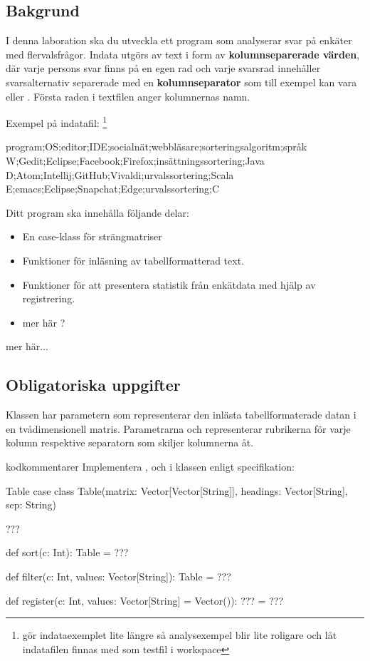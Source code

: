 \subsection{Bakgrund}

I denna laboration ska du utveckla ett program som analyserar svar på enkäter med flervalsfrågor. Indata utgörs av text i form av \textbf{kolumnseparerade värden}, där varje persons svar finns på en egen rad och varje svarsrad innehåller svarsalternativ separerade med en \textbf{kolumnseparator} som till exempel kan vara \code{;} eller \code{\t}. Första raden i textfilen anger kolumnernas namn.

Exempel på indatafil: \footnote{\TODO gör indataexemplet lite längre så analysexempel blir lite roligare och låt indatafilen finnas med som testfil i workspace}
\begin{CodeSmall}[language=, ]
program;OS;editor;IDE;socialnät;webbläsare;sorteringsalgoritm;språk
W;Gedit;Eclipse;Facebook;Firefox;insättningssortering;Java
D;Atom;Intellij;GitHub;Vivaldi;urvalssortering;Scala
E;emacs;Eclipse;Snapchat;Edge;urvalssortering;C
\end{CodeSmall}

Ditt program ska innehålla följande delar:
\begin{itemize}
\item En case-klass för strängmatriser 
\item Funktioner för inläsning av tabellformatterad text.
\item Funktioner för att presentera statistik från enkätdata med hjälp av registrering.
\item \TODO mer här ?
\end{itemize}

\TODO mer här...

\subsection{Obligatoriska uppgifter}

Klassen  har parametern  som representerar den inlästa tabellformaterade datan i en tvådimensionell matris. Parametrarna  och  representerar rubrikerna för varje kolumn respektive separatorn som skiljer kolumnerna åt.

\TODO kodkommentarer
\Task Implementera ,  och  i klassen  enligt specifikation:

\begin{ScalaSpec}{Table}
case class Table(matrix: Vector[Vector[String]], headings: Vector[String], sep: String) {

  ???

  def sort(c: Int): Table = ???

  def filter(c: Int, values: Vector[String]): Table = ???

  def register(c: Int, values: Vector[String] = Vector()): ??? = ???
}
\end{ScalaSpec}

